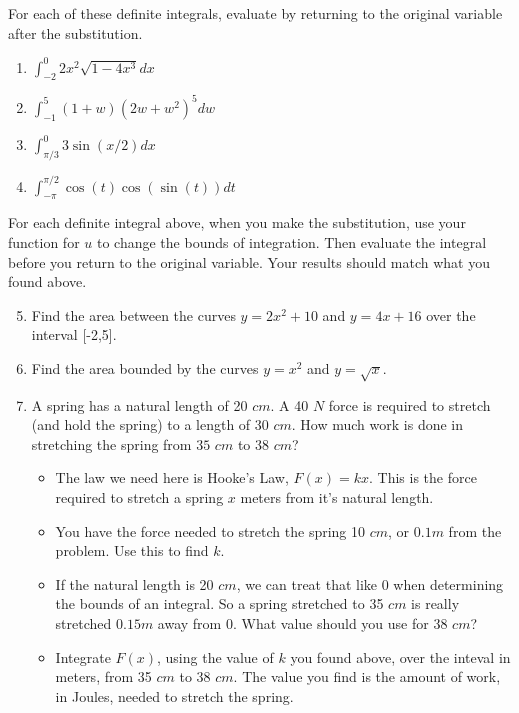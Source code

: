 \documentclass{article}
\begin{document}
For each of these definite integrals, evaluate by returning to the original variable after the substitution.
\begin{enumerate}
    \item $\int_{-2}^0 2x^2\sqrt{1 - 4x^3} dx$
    \item $\int_{-1}^5 (1+w)(2w + w^2)^5 dw$
    \item $\int_{\pi/3}^0 3\sin(x/2)dx$
    \item $\int_{-\pi}^{\pi/2} \cos(t)\cos(\sin(t))dt$
\end{enumerate}
For each definite integral above, when you make the substitution, use your function for $u$ to change the bounds of integration. Then evaluate the integral before you return to the original variable. Your results should match what you found above.

\begin{enumerate}
    \setcounter{enumi}{4}
    \item Find the area between the curves $y = 2x^2 + 10$ and $y = 4x + 16$ over the interval [-2,5].
    \item Find the area bounded by the curves $y = x^2$ and $y = \sqrt{x}$.
    \item A spring has a natural length of 20 $cm$. A 40 $N$ force is required to stretch (and hold the spring) to a length of 30 $cm$. How much work is done in stretching the spring from $35$ $cm$ to 38 $cm$?
    \begin{itemize}
        \item The law we need here is Hooke's Law, $F(x) = kx$. This is the force required to stretch a spring $x$ meters from it's natural length.
        \item You have the force needed to stretch the spring 10 $cm$, or $0.1m$ from the problem. Use this to find $k$.
        \item If the natural length is 20 $cm$, we can treat that like 0 when determining the bounds of an integral. So a spring stretched to 35 $cm$ is really stretched $0.15m$ away from 0. What value should you use for 38 $cm$?
        \item Integrate $F(x)$, using the value of $k$ you found above, over the inteval in meters, from 35 $cm$ to 38 $cm$. The value you find is the amount of work, in Joules, needed to stretch the spring.
    \end{itemize}
\end{enumerate}
\end{document}
